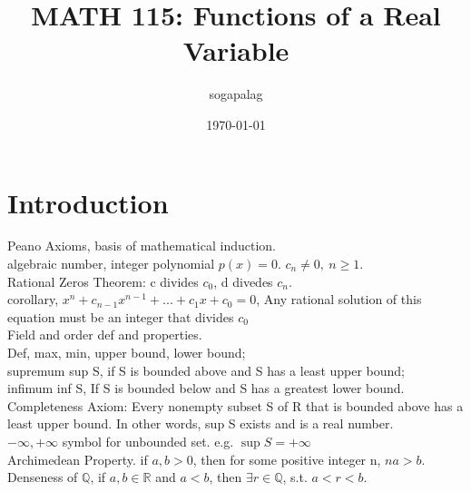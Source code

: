 \documentclass[paper=a4, fontsize=11pt]{scrartcl} %
\title{MATH 115: Functions of a Real Variable}
\author{sogapalag}
\date{\normalsize\today}
\numberwithin{equation}{section} %
\numberwithin{figure}{section} %
\numberwithin{table}{section} %
\begin{document}
\maketitle

\section{Introduction}
Peano Axioms, basis of mathematical induction.\\
algebraic number, integer polynomial $p(x)=0$. $c_n\neq 0,\ n\geq 1$.\\
Rational Zeros Theorem: c divides $c_0$, d divedes $c_n$.\\
corollary, $x^n+c_{n-1}x^{n-1}+...+c_1x+c_0=0$, Any rational solution of this equation must be an integer that divides $c_0$\\
Field and order def and properties.\\
Def, max, min, upper bound, lower bound;\\
supremum sup S, if S is bounded above and S has a least upper bound;\\
infimum inf S, If S is bounded below and S has a greatest lower bound.\\
Completeness Axiom: Every nonempty subset S of R that is bounded above has a least upper bound. In other words, sup S exists and is a real number.\\
$-\infty,+\infty$ symbol for unbounded set. e.g. $\sup S=+\infty$\\
Archimedean Property. if $a,b>0$, then for some positive integer n, $na>b$.\\
Denseness of $\mathbb{Q}$, if $a,b\in\mathbb{R}$ and $a<b$, then $\exists r\in\mathbb{Q}$, s.t. $a<r<b$.\\
\end{document}
